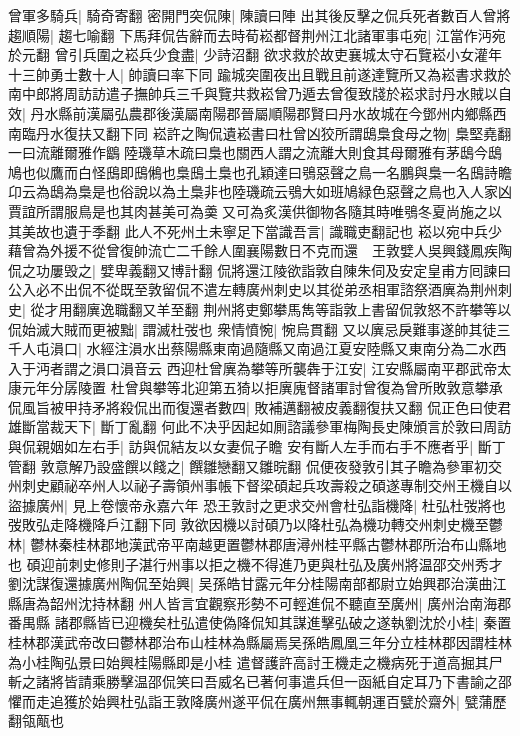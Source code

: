 曾軍多騎兵|{
	騎奇寄翻}
密開門突侃陳|{
	陳讀曰陣}
出其後反擊之侃兵死者數百人曾將趨順陽|{
	趨七喻翻}
下馬拜侃告辭而去時荀崧都督荆州江北諸軍事屯宛|{
	江當作沔宛於元翻}
曾引兵圍之崧兵少食盡|{
	少詩沼翻}
欲求救於故吏襄城太守石覽崧小女灌年十三帥勇士數十人|{
	帥讀曰率下同}
踰城突圍夜出且戰且前遂達覽所又為崧書求救於南中郎將周訪訪遣子撫帥兵三千與覽共救崧曾乃遁去曾復致牋於崧求討丹水賊以自效|{
	丹水縣前漢屬弘農郡後漢屬南陽郡晉屬順陽郡賢曰丹水故城在今鄧州内鄉縣西南臨丹水復扶又翻下同}
崧許之陶侃遺崧書曰杜曾凶狡所謂鴟梟食母之物|{
	梟堅堯翻一曰流離爾雅作鶹陸璣草木疏曰梟也關西人謂之流離大則食其母爾雅有茅鴟今鴟鳩也似鷹而白怪䲭即䲭鵂也梟䲭土梟也孔穎達曰鴞惡聲之鳥一名鵬與梟一名䲭詩瞻卬云為鴟為梟是也俗說以為土梟非也陸璣疏云鴞大如班鳩緑色惡聲之鳥也入人家凶賈誼所謂服鳥是也其肉甚美可為羮又可為炙漢供御物各隨其時唯鴞冬夏尚施之以其美故也遺于季翻}
此人不死州土未寧足下當識吾言|{
	識職吏翻記也}
崧以宛中兵少藉曾為外援不從曾復帥流亡二千餘人圍襄陽數日不克而還　王敦嬖人吳興錢鳳疾陶侃之功屢毁之|{
	嬖卑義翻又博計翻}
侃將還江陵欲詣敦自陳朱伺及安定皇甫方囘諫曰公入必不出侃不從既至敦留侃不遣左轉廣州刺史以其從弟丞相軍諮祭酒廙為荆州刺史|{
	從才用翻廙逸職翻又羊至翻}
荆州將吏鄭攀馬雋等詣敦上書留侃敦怒不許攀等以侃始滅大賊而更被黜|{
	謂滅杜弢也}
衆情憤惋|{
	惋烏貫翻}
又以廙忌戾難事遂帥其徒三千人屯溳口|{
	水經注溳水出蔡陽縣東南過隨縣又南過江夏安陸縣又東南分為二水西入于沔者謂之溳口溳音云}
西迎杜曾廙為攀等所襲犇于江安|{
	江安縣屬南平郡武帝太康元年分孱陵置}
杜曾與攀等北迎第五猗以拒廙廆督諸軍討曾復為曾所敗敦意攀承侃風旨被甲持矛將殺侃出而復還者數四|{
	敗補邁翻被皮義翻復扶又翻}
侃正色曰使君雄斷當裁天下|{
	斷丁亂翻}
何此不决乎因起如厠諮議參軍梅陶長史陳頒言於敦曰周訪與侃親姻如左右手|{
	訪與侃結友以女妻侃子瞻}
安有斷人左手而右手不應者乎|{
	斷丁管翻}
敦意解乃設盛饌以餞之|{
	饌雛戀翻又雛晥翻}
侃便夜發敦引其子瞻為參軍初交州刺史顧祕卒州人以祕子壽領州事帳下督梁碩起兵攻壽殺之碩遂專制交州王機自以盜據廣州|{
	見上卷懷帝永嘉六年}
恐王敦討之更求交州會杜弘詣機降|{
	杜弘杜弢將也弢敗弘走降機降戶江翻下同}
敦欲因機以討碩乃以降杜弘為機功轉交州刺史機至鬱林|{
	鬱林秦桂林郡地漢武帝平南越更置鬱林郡唐潯州桂平縣古鬱林郡所治布山縣地也}
碩迎前刺史修則子湛行州事以拒之機不得進乃更與杜弘及廣州將温邵交州秀才劉沈謀復還據廣州陶侃至始興|{
	吴孫皓甘露元年分桂陽南部都尉立始興郡治漢曲江縣唐為韶州沈持林翻}
州人皆言宜觀察形勢不可輕進侃不聽直至廣州|{
	廣州治南海郡番禺縣}
諸郡縣皆已迎機矣杜弘遣使偽降侃知其謀進擊弘破之遂執劉沈於小桂|{
	秦置桂林郡漢武帝改曰鬱林郡治布山桂林為縣屬焉吴孫皓鳳凰三年分立桂林郡因謂桂林為小桂陶弘景曰始興桂陽縣即是小桂}
遣督護許高討王機走之機病死于道高掘其尸斬之諸將皆請乘勝擊温邵侃笑曰吾威名已著何事遣兵但一函紙自定耳乃下書諭之邵懼而走追獲於始興杜弘詣王敦降廣州遂平侃在廣州無事輒朝運百甓於齋外|{
	甓蒲歷翻瓴甋也}
